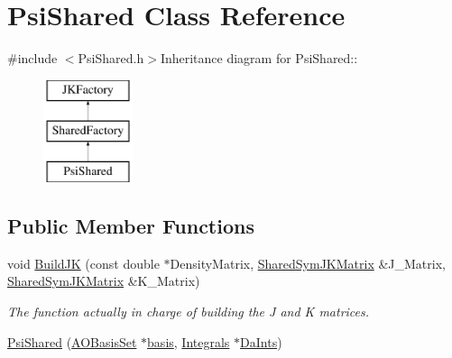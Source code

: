 \hypertarget{classJKBuilder_1_1PsiShared}{
\section{PsiShared Class Reference}
\label{classJKBuilder_1_1PsiShared}
}


{\ttfamily \#include $<$PsiShared.h$>$}Inheritance diagram for PsiShared::\begin{figure}[H]
\begin{center}
\leavevmode
\includegraphics[height=3cm]{classJKBuilder_1_1PsiShared}
\end{center}
\end{figure}
\subsection*{Public Member Functions}
\begin{DoxyCompactItemize}
\item 
void \hyperlink{classJKBuilder_1_1PsiShared_aa5f73a8109ec88464262262164feda1e}{BuildJK} (const double $\ast$DensityMatrix, \hyperlink{namespaceJKBuilder_aef21bc37b7cf7bc5ebb5a48628db8d0f}{SharedSymJKMatrix} \&J\_\-Matrix, \hyperlink{namespaceJKBuilder_aef21bc37b7cf7bc5ebb5a48628db8d0f}{SharedSymJKMatrix} \&K\_\-Matrix)
\begin{DoxyCompactList}\small\item\em The function actually in charge of building the J and K matrices. \item\end{DoxyCompactList}\item 
\hyperlink{classJKBuilder_1_1PsiShared_a6500ac4c346e1a9c8c27f8b9f02bb29b}{PsiShared} (\hyperlink{classJKBuilder_1_1AOBasisSet}{AOBasisSet} $\ast$\hyperlink{classJKBuilder_1_1PsiShared_a33250ff04c740919f41b0ffb6c78ada5}{basis}, \hyperlink{classJKBuilder_1_1Integrals}{Integrals} $\ast$\hyperlink{classJKBuilder_1_1PsiShared_abff505bf91f526e978bc6abbf3e0cfc5}{DaInts})
\end{DoxyCompactItemize}
